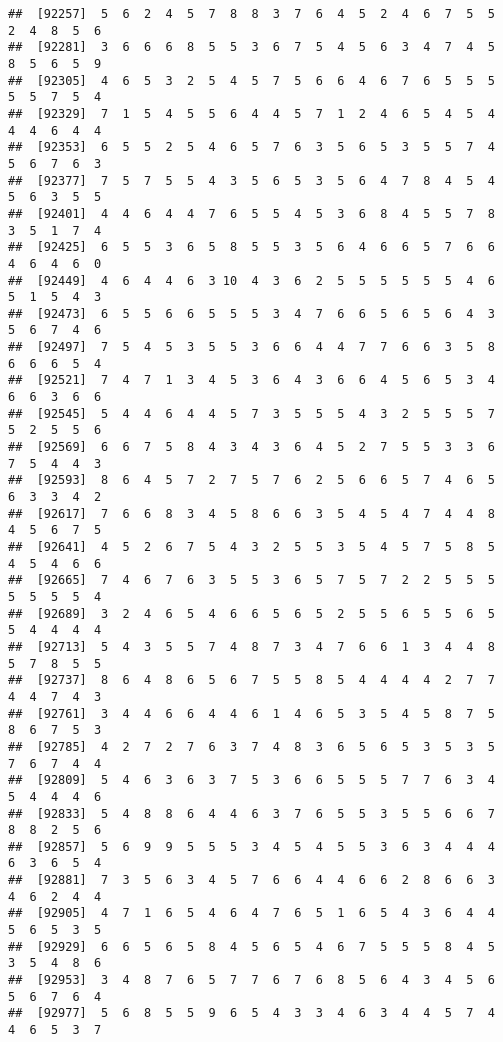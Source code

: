 \documentclass[
]{book}
\begin{document}
\begin{verbatim}
##  [92257]  5  6  2  4  5  7  8  8  3  7  6  4  5  2  4  6  7  5  5  2  4  8  5  6
##  [92281]  3  6  6  6  8  5  5  3  6  7  5  4  5  6  3  4  7  4  5  8  5  6  5  9
##  [92305]  4  6  5  3  2  5  4  5  7  5  6  6  4  6  7  6  5  5  5  5  5  7  5  4
##  [92329]  7  1  5  4  5  5  6  4  4  5  7  1  2  4  6  5  4  5  4  4  4  6  4  4
##  [92353]  6  5  5  2  5  4  6  5  7  6  3  5  6  5  3  5  5  7  4  5  6  7  6  3
##  [92377]  7  5  7  5  5  4  3  5  6  5  3  5  6  4  7  8  4  5  4  5  6  3  5  5
##  [92401]  4  4  6  4  4  7  6  5  5  4  5  3  6  8  4  5  5  7  8  3  5  1  7  4
##  [92425]  6  5  5  3  6  5  8  5  5  3  5  6  4  6  6  5  7  6  6  4  6  4  6  0
##  [92449]  4  6  4  4  6  3 10  4  3  6  2  5  5  5  5  5  5  4  6  5  1  5  4  3
##  [92473]  6  5  5  6  6  5  5  5  3  4  7  6  6  5  6  5  6  4  3  5  6  7  4  6
##  [92497]  7  5  4  5  3  5  5  3  6  6  4  4  7  7  6  6  3  5  8  6  6  6  5  4
##  [92521]  7  4  7  1  3  4  5  3  6  4  3  6  6  4  5  6  5  3  4  6  6  3  6  6
##  [92545]  5  4  4  6  4  4  5  7  3  5  5  5  4  3  2  5  5  5  7  5  2  5  5  6
##  [92569]  6  6  7  5  8  4  3  4  3  6  4  5  2  7  5  5  3  3  6  7  5  4  4  3
##  [92593]  8  6  4  5  7  2  7  5  7  6  2  5  6  6  5  7  4  6  5  6  3  3  4  2
##  [92617]  7  6  6  8  3  4  5  8  6  6  3  5  4  5  4  7  4  4  8  4  5  6  7  5
##  [92641]  4  5  2  6  7  5  4  3  2  5  5  3  5  4  5  7  5  8  5  4  5  4  6  6
##  [92665]  7  4  6  7  6  3  5  5  3  6  5  7  5  7  2  2  5  5  5  5  5  5  5  4
##  [92689]  3  2  4  6  5  4  6  6  5  6  5  2  5  5  6  5  5  6  5  5  4  4  4  4
##  [92713]  5  4  3  5  5  7  4  8  7  3  4  7  6  6  1  3  4  4  8  5  7  8  5  5
##  [92737]  8  6  4  8  6  5  6  7  5  5  8  5  4  4  4  4  2  7  7  4  4  7  4  3
##  [92761]  3  4  4  6  6  4  4  6  1  4  6  5  3  5  4  5  8  7  5  8  6  7  5  3
##  [92785]  4  2  7  2  7  6  3  7  4  8  3  6  5  6  5  3  5  3  5  7  6  7  4  4
##  [92809]  5  4  6  3  6  3  7  5  3  6  6  5  5  5  7  7  6  3  4  5  4  4  4  6
##  [92833]  5  4  8  8  6  4  4  6  3  7  6  5  5  3  5  5  6  6  7  8  8  2  5  6
##  [92857]  5  6  9  9  5  5  5  3  4  5  4  5  5  3  6  3  4  4  4  6  3  6  5  4
##  [92881]  7  3  5  6  3  4  5  7  6  6  4  4  6  6  2  8  6  6  3  4  6  2  4  4
##  [92905]  4  7  1  6  5  4  6  4  7  6  5  1  6  5  4  3  6  4  4  5  6  5  3  5
##  [92929]  6  6  5  6  5  8  4  5  6  5  4  6  7  5  5  5  8  4  5  3  5  4  8  6
##  [92953]  3  4  8  7  6  5  7  7  6  7  6  8  5  6  4  3  4  5  6  5  6  7  6  4
##  [92977]  5  6  8  5  5  9  6  5  4  3  3  4  6  3  4  4  5  7  4  4  6  5  3  7

\end{verbatim}
\end{document}
